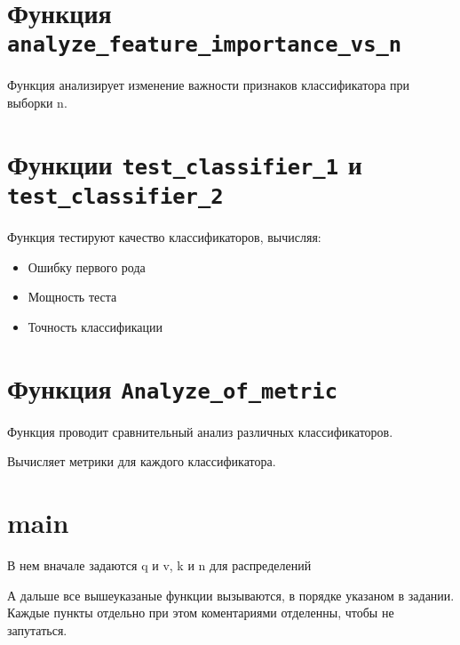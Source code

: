 \documentclass{article}
\begin{document}
\section{Функция \texttt{analyze\_feature\_importance\_vs\_n}}
Функция анализирует изменение важности признаков классификатора при выборки n.

\section{Функции \texttt{test\_classifier\_1} и \texttt{test\_classifier\_2}}
Функция тестируют качество классификаторов, вычисляя:
\begin{itemize}
\item Ошибку первого рода
\item Мощность теста
\item Точность классификации
\end{itemize}

\section{Функция \texttt{Analyze\_of\_metric}}
Функция проводит сравнительный анализ различных классификаторов.

Вычисляет метрики для каждого классификатора.

\section{main}

В нем вначале задаются q и v, k и n для распределений

А дальше все вышеуказаные функции вызываются, в порядке указаном в задании. Каждые пункты отдельно при этом коментариями отделенны, чтобы не запутаться.
\end{document}
